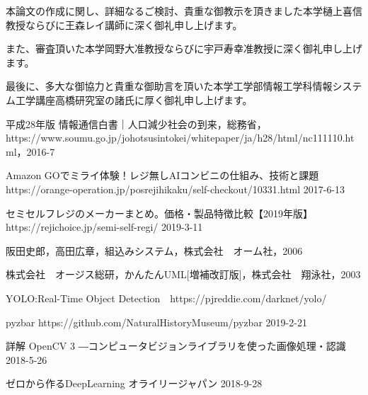 本論文の作成に関し、詳細なるご検討、貴重な御教示を頂きました本学樋上喜信教授ならびに王森レイ講師に深く御礼申し上げます。

また、審査頂いた本学岡野大准教授ならびに宇戸寿幸准教授に深く御礼申し上げます。

最後に、多大な御協力と貴重な御助言を頂いた本学工学部情報工学科情報システム工学講座高橋研究室の諸氏に厚く御礼申し上げます。


\begin{thebibliography}{99}

平成28年版 情報通信白書｜人口減少社会の到来，総務省，https://www.soumu.go.jp/johotsusintokei/whitepaper/ja/h28/html/nc111110.html，2016-7

Amazon GOでミライ体験！レジ無しAIコンビニの仕組み、技術と課題 https://orange-operation.jp/posrejihikaku/self-checkout/10331.html 2017-6-13

セミセルフレジのメーカーまとめ。価格・製品特徴比較【2019年版】 https://rejichoice.jp/semi-self-regi/
2019-3-11

阪田史郎，高田広章，組込みシステム，株式会社　オーム社，2006

株式会社　オージス総研，かんたんUML[増補改訂版]，株式会社　翔泳社，2003

YOLO:Real-Time Object Detection　https://pjreddie.com/darknet/yolo/

pyzbar https://github.com/NaturalHistoryMuseum/pyzbar 2019-2-21

詳解 OpenCV 3 ―コンピュータビジョンライブラリを使った画像処理・認識 2018-5-26

ゼロから作るDeepLearning オライリージャパン  2018-9-28


\end{thebibliography}

